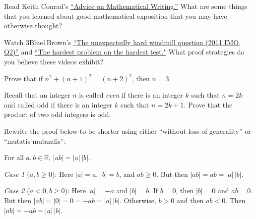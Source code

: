 \documentclass[11pt,letterpaper]{article}
\begin{document}
\homework{}

 Read Keith Conrad's \href{https://kconrad.math.uconn.edu/blurbs/proofs/writingtips.pdf}{``Advice on Mathematical Writing.''} What are some things that you learned about good mathematical exposition that you may have otherwise thought? \pspace





\newpage





 Watch 3Blue1Brown's \href{https://www.youtube.com/watch?v=M64HUIJFTZM}{``The unexpectedly hard windmill question (2011 IMO, Q2)''} and \href{https://www.youtube.com/watch?v=OkmNXy7er84}{``The hardest problem on the hardest test."} What proof strategies do you believe these videos exhibit? \pspace





\newpage





 Prove that if $n^2 + (n + 1)^2= (n + 2)^2$, then $n= 3$. \pspace





\newpage





 Recall that an integer $n$ is called \textit{even} if there is an integer $k$ such that $n= 2k$ and called odd if there is an integer $k$ such that $n= 2k + 1$. Prove that the product of two odd integers is odd. \pspace





\newpage





 Rewrite the proof below to be shorter using either ``without loss of generality'' or ``mutatis mutandis'': \pspace

\begin{thm*}
For all $a, b \in \mathbb{R}$, $|ab|= |a| \, |b|$. 
\end{thm*}

\pf

\textit{Case 1} ($a, b \geq 0$): Here $|a|= a$, $|b|= b$, and $ab \geq 0$. But then $|ab|= ab = |a| \, |b|$. 

\textit{Case 2} ($a < 0, b \geq 0$): Here $|a|= -a$ and $|b|= b$. If $b= 0$, then $|b|= 0$ and $ab= 0$. But then $|ab|= |0|= 0 = -ab= |a| \,|b|$. Otherwise, $b > 0$ and then $ab < 0$. Then $|ab|= -ab= |a| \, |b|$. 
\end{document}
